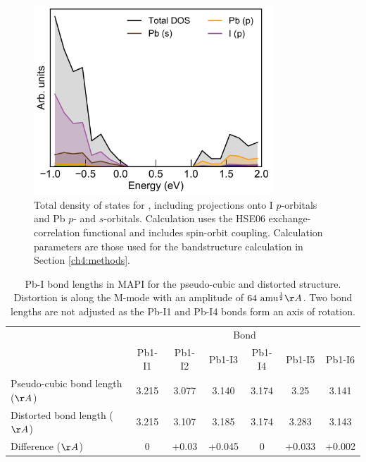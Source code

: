 \begin{figure}[h] \centering
\includegraphics[width=0.8\textwidth]{figures/ch5/dos.pdf}
\caption[Total and projected density of states]{\label{ch5pdos}
Total density of states for , including projections onto I $p$-orbitals and Pb $p$- and $s$-orbitals. Calculation uses the HSE06 exchange-correlation functional and includes spin-orbit coupling. Calculation parameters are those used for the bandstructure calculation in Section \ref{ch4:methods}.
}
\end{figure}

\begin{table}[h]  \centering
\caption[Pb-I bond lengths] {Pb-I bond lengths in MAPI for the pseudo-cubic and distorted structure. Distortion is along the M-mode with an amplitude of $64\ \textrm{amu}^{\frac{1}{2}}\AA$. Two bond lengths are not adjusted as the Pb-I1 and Pb-I4 bonds form an axis of rotation. }
\label{ch5bondlength}
\begin{tabular}{lcccccc} 
    \toprule
    &   \multicolumn{6}{c}{Bond} \\
 & Pb1-I1 & Pb1-I2 & Pb1-I3 & Pb1-I4 & Pb1-I5 & Pb1-I6 \\ 
    \midrule
Pseudo-cubic bond length ($\AA$) & 3.215 & 3.077 & 3.140 & 3.174& 3.25&3.141 \\
Distorted bond length ($\AA$)& 3.215& 3.107&3.185 & 3.174 & 3.283&3.143 \\
Difference ($\AA$) & 0 &+0.03 &+0.045 &0 &+0.033 &+0.002 \\
    \bottomrule
\end{tabular}
\end{table}

